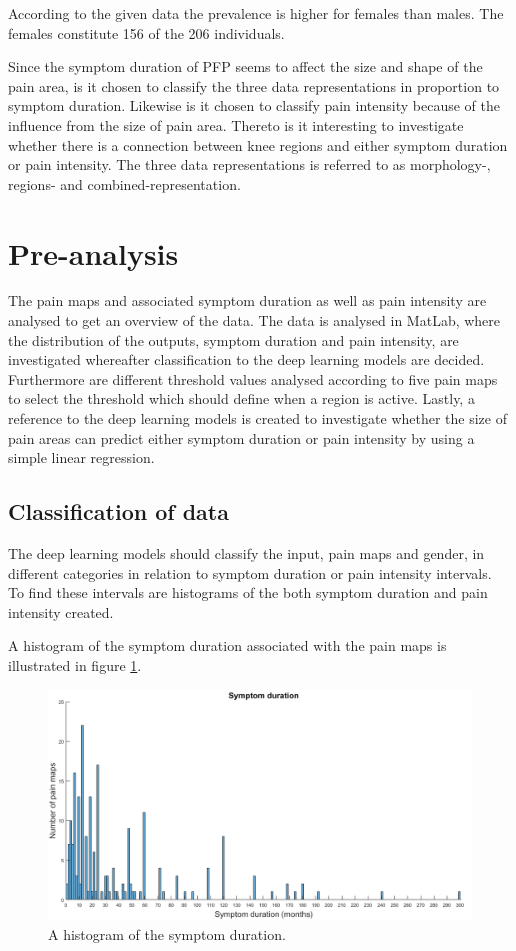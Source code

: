 \noindent
According to the given data the prevalence is higher for females than males. The females constitute 156 of the 206 individuals.


\noindent
Since the symptom duration of PFP seems to affect the size and shape of the pain area, is it chosen to classify the three data representations in proportion to symptom duration. Likewise is it chosen to classify pain intensity because of the influence from the size of pain area. Thereto is it interesting to investigate whether there is a connection between knee regions and either symptom duration or pain intensity.
The three data representations is referred to as morphology-, regions- and combined-representation.
\newpage

\section{Pre-analysis}
The pain maps and associated symptom duration as well as pain intensity are analysed to get an overview of the data. The data is analysed in MatLab, where the distribution of the outputs, symptom duration and pain intensity, are investigated whereafter classification to the deep learning models are decided. Furthermore are different threshold values analysed according to five pain maps to select the threshold which should define when a region is active. Lastly, a reference to the deep learning models is created to investigate whether the size of pain areas can predict either symptom duration or pain intensity by using a simple linear regression.


\subsection{Classification of data}
The deep learning models should classify the input, pain maps and gender, in different categories in relation to symptom duration or pain intensity intervals. To find these intervals are histograms of the both symptom duration and pain intensity created.

\noindent
A histogram of the symptom duration associated with the pain maps is illustrated in figure \ref{fig:histoduration}.

\begin{figure} [H]
\centering
\includegraphics[width=1\textwidth]{figures/histogramDuration}
\caption{A histogram of the symptom duration.}
\label{fig:histoduration}
\end{figure}

